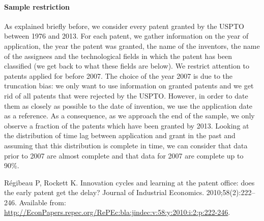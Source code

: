 \paragraph{Sample restriction}
As explained briefly before, we consider every patent granted by the USPTO between 1976 and 2013. For each patent, we gather information on the year of application, the year the patent was granted, the name of the inventors, the name of the assignees and the technological fields in which the patent has been classified (we get back to what these fields are below). We restrict attention to patents applied for before 2007. The choice of the year 2007 is due to the truncation bias: we only want to use information on granted patents and we get rid of all patents that were rejected by the USPTO. However, in order to date them as closely as possible to the date of invention, we use the application date as a reference. As a consequence, as we approach the end of the sample, we only observe a fraction of the patents which have been granted by 2013. Looking at the distribution of time lag between application and grant in the past and assuming that this distribution is complete in time, we can consider that data prior to 2007 are almost complete and that data for 2007 are complete up to 90\%.


\begin{thebibliography}{10}

R{\'e}gibeau P, Rockett K.
\newblock Innovation cycles and learning at the patent office: does the early
  patent get the delay?
\newblock Journal of Industrial Economics. 2010;58(2):222--246.
\newblock Available from:
  \url{http://EconPapers.repec.org/RePEc:bla:jindec:v:58:y:2010:i:2:p:222-246}.

\end{thebibliography}










